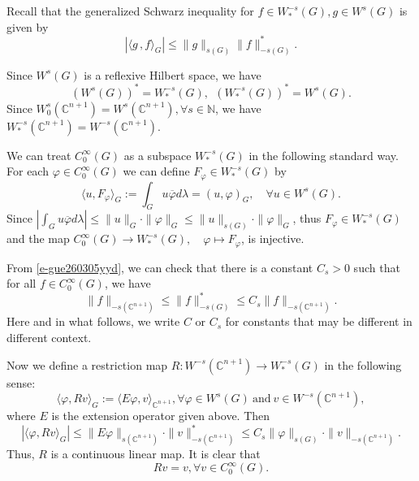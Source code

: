 \documentclass[a4paper,centertags,oneside,12pt]{amsart}
\numberwithin{equation}{section}
\begin{document}
Recall that the generalized Schwarz inequality  for $f\in W^{-s}_{\ast}(G), g\in W^s(G)$ is given by 
$$|\langle g\,, f\rangle_G|\leq \|g\|_{s(G)} \|f\|^\ast_{-s(G)}.$$

Since $W^s(G)$ is a reflexive Hilbert space, we have
$$(W^s(G))^\ast=W^{-s}_{\ast}(G),~~(W^{-s}_\ast(G))^\ast=W^s(G).$$
Since $W_0^s(\mathbb C^{n+1})=W^s(\mathbb C^{n+1}), \forall s\in\mathbb N$, we have $W^{-s}_{\ast}(\mathbb C^{n+1})=W^{-s}(\mathbb C^{n+1})$. 

We can treat $C_0^\infty(G)$ as a subspace $ W_\ast^{-s}(G)$ in the following standard way. For each $\varphi\in C_0^\infty(G)$
     we can define $F_{\varphi}\in W_\ast^{-s}(G)$ by
    $$\langle  u, F_{\varphi}\rangle_G:=\int_{G}u\overline\varphi d\lambda=(u, \varphi)_G, \quad\forall u\in W^s(G).$$
    Since $|\int_{G}u\overline \varphi d\lambda|\leq \|u\|_G\cdot\|\varphi\|_G\leq \|u\|_{s(G)}\cdot\|\varphi\|_G$, thus $F_\varphi\in W^{-s}_\ast(G)$ and the map $C_0^\infty(G)\rightarrow W_\ast^{-s}(G), \quad \varphi\mapsto F_\varphi$, is injective.


From \eqref{e-gue260305yyd}, we can check that there is a constant $C_s>0$ such that for all $f\in C_0^\infty(G)$, we have
 $$\|f\|_{-s(\mathbb C^{n+1})}\leq \|f\|^\ast_{-s(G)}\leq C_s\|f\|_{-s(\mathbb C^{n+1})}.$$
Here and in what follows, we write $C$ or $C_s$ for constants that may be different in different context.

Now we define a restriction map $R: W^{-s}(\mathbb C^{n+1})\rightarrow W^{-s}_\ast(G)$ in the following sense:
\begin{equation*}
    \langle\varphi, Rv\rangle_G:=\langle  E\varphi, v\rangle_{\mathbb C^{n+1}}, \forall \varphi\in W^s(G)~\text{and}~ v\in W^{-s}(\mathbb C^{n+1}), 
\end{equation*}
where $E$ is the extension operator given above. Then
\begin{equation*}
    |\langle\varphi, Rv\rangle_G|\leq \|E\varphi\|_{s(\mathbb C^{n+1})}\cdot\|v\|_{-s(\mathbb C^{n+1})}^\ast\leq C_s \|\varphi\|_{s(G)}\cdot\|v\|_{-s(\mathbb C^{n+1})}.
\end{equation*}
Thus, $R$ is a continuous linear map. It is clear  that $$Rv=v, \forall v\in C_0^\infty(G).$$
\end{document}
